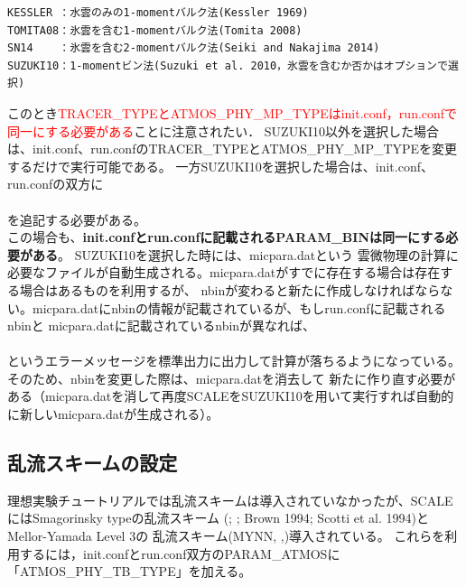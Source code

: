 \begin{verbatim}
KESSLER ：水雲のみの1-momentバルク法(Kessler 1969)
TOMITA08：氷雲を含む1-momentバルク法(Tomita 2008)
SN14    ：氷雲を含む2-momentバルク法(Seiki and Nakajima 2014)
SUZUKI10：1-momentビン法(Suzuki et al. 2010，氷雲を含むか否かはオプションで選択)
\end{verbatim}

このとき\textcolor{red}{TRACER\_TYPEとATMOS\_PHY\_MP\_TYPEはinit.conf，run.confで同一にする必要がある}ことに注意されたい．
SUZUKI10以外を選択した場合は、init.conf、run.confのTRACER\_TYPEとATMOS\_PHY\_MP\_TYPEを変更するだけで実行可能である。
一方SUZUKI10を選択した場合は、init.conf、run.confの双方に\\

\\

を追記する必要がある。\\
この場合も、{\bf init.confとrun.confに記載されるPARAM\_BINは同一にする必要がある}。
SUZUKI10を選択した時には、micpara.datという
雲微物理の計算に必要なファイルが自動生成される。micpara.datがすでに存在する場合は存在する場合はあるものを利用するが、
nbinが変わると新たに作成しなければならない。micpara.datにnbinの情報が記載されているが、もしrun.confに記載されるnbinと
micpara.datに記載されているnbinが異なれば、\\

\\

\noindent というエラーメッセージを標準出力に出力して計算が落ちるようになっている。
そのため、nbinを変更した際は、micpara.datを消去して
新たに作り直す必要がある（micpara.datを消して再度SCALEをSUZUKI10を用いて実行すれば自動的に新しいmicpara.datが生成される）。


\subsection{乱流スキームの設定} \label{sec:adv_turbulence}
理想実験チュートリアルでは乱流スキームは導入されていなかったが、SCALEにはSmagorinsky typeの乱流スキーム
(\cite{smagorinsky_1963}; \cite{lilly_1962}; Brown 1994; Scotti et al. 1994)とMellor-Yamada Level 3の
乱流スキーム(MYNN, \cite{my_1982},\cite{nakanishi_2004})導入されている。
これらを利用するには，init.confとrun.conf双方のPARAM\_ATMOSに「ATMOS\_PHY\_TB\_TYPE」を加える。

